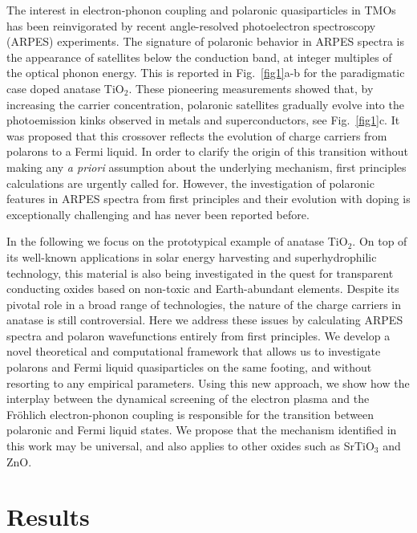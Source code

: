 \documentclass[12pt]{nature}
\begin{document}
The interest in electron-phonon coupling and polaronic quasiparticles in TMOs has been reinvigorated 
by recent angle-resolved photoelectron spectroscopy (ARPES) experiments\cite{Moser2013,
Chen2015,Cancellieri2016,Baumberger2016,Yukawa2016}. 
The signature of polaronic behavior in ARPES spectra is the appearance of satellites below the 
conduction band, at integer multiples of the optical phonon energy. This is reported 
in Fig.~\ref{fig1}a-b for the paradigmatic case doped anatase TiO$_2$\cite{Moser2013}. These 
pioneering measurements showed that, by increasing the carrier concentration, polaronic satellites 
gradually evolve into the photoemission kinks observed in metals and superconductors\cite{Damascelli2003}, 
see Fig.~\ref{fig1}c. It was proposed that this crossover reflects the evolution of charge carriers from 
polarons to a Fermi liquid\cite{Moser2013,Baumberger2016}. In order to clarify the origin of this transition 
without making any {\it a priori} assumption about the underlying mechanism, first principles 
calculations are urgently called for. However, the investigation of polaronic features 
in ARPES spectra from first principles and their evolution with doping is exceptionally challenging 
and has never been reported before.

In the following we focus on the prototypical example of anatase TiO$_2$. On top of its well-known 
applications in solar energy harvesting\cite{Hardin2012, Snaith2014} and superhydrophilic 
technology\cite{Fujishima1972, Fujishima2000}, this material is also being investigated in the quest 
for transparent conducting oxides based on non-toxic and Earth-abundant elements\cite{Furubayashi2005,
Ellmer2012}. Despite its pivotal role in a broad range of technologies, the nature of the charge carriers 
in anatase is still controversial\cite{DeAngelis2014}. Here we address these issues by calculating ARPES 
spectra and polaron wavefunctions entirely from first principles. We develop a novel theoretical and 
computational framework that allows us to investigate polarons and Fermi liquid quasiparticles on the 
same footing, and without resorting to any empirical parameters. Using this new approach, we show how 
the interplay between the dynamical screening of the electron plasma and the Fr\"ohlich electron-phonon 
coupling is responsible for the transition between polaronic and Fermi liquid states. We propose that 
the mechanism identified in this work may be universal, and also applies to other oxides such as 
SrTiO$_3$ and ZnO. 


\section*{\textsf{Results}} 
\end{document}
